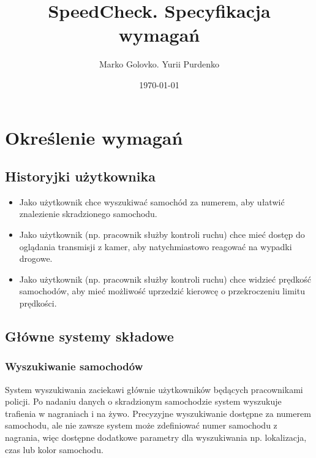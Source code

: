 \documentclass[12pt]{article}
\title{SpeedCheck. Specyfikacja wymagań}
\author{Marko Golovko. Yurii Purdenko}
\date{\today}
\begin{document}
\begin{titlepage}
\maketitle
\end{titlepage}

\renewcommand{\vhhistoryname}{Historia zmian}
\newcommand{\MG}{Marko Golovko}
\begin{versionhistory}
  \renewcommand{\vhhistoryname}{Histria zmian}
  \renewcommand{\vhversionname}{Numer wersji}  
  \renewcommand{\vhdatename}{Data} 
  \renewcommand{\vhauthorname}{Autor} 
  \renewcommand{\vhchangename}{Opis}
\end{versionhistory}

\tableofcontents

\section{Określenie wymagań}
\subsection{Historyjki użytkownika}
\begin{itemize}
\item Jako użytkownik chce wyszukiwać samochód za numerem, aby ułatwić znalezienie skradzionego samochodu.
\item Jako użytkownik (np. pracownik służby kontroli ruchu) chce mieć dostęp do oglądania transmisji z kamer, aby natychmiastowo reagować na wypadki drogowe.
\item Jako użytkownik (np. pracownik służby kontroli ruchu) chce widzieć prędkość samochodów, aby mieć możliwość uprzedzić kierowcę o przekroczeniu limitu prędkości.
\end{itemize}
\subsection{Główne systemy składowe}
\subsubsection*{Wyszukiwanie samochodów}
System wyszukiwania zaciekawi głównie użytkowników będących pracownikami policji. Po nadaniu danych o skradzionym samochodzie system wyszukuje trafienia w nagraniach i na żywo. Precyzyjne wyszukiwanie dostępne za numerem samochodu, ale nie zawsze  system może zdefiniować numer samochodu z nagrania, więc dostępne dodatkowe parametry dla wyszukiwania np. lokalizacja, czas lub kolor samochodu. 
\end{document}
